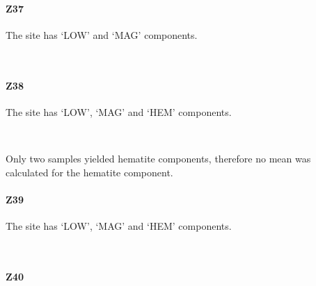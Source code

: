 \documentclass[11pt]{article}
\begin{document}
    \paragraph{Z37}\label{z37}

The site has `LOW' and `MAG' components.



    \begin{center}
    \end{center}
    { \hspace*{\fill} \\}
    
    \newpage
    
    \paragraph{Z38}\label{z38}

    The site has `LOW', `MAG' and `HEM' components.



    \begin{center}
    \end{center}
    { \hspace*{\fill} \\}
    
    Only two samples yielded hematite components, therefore no mean was
calculated for the hematite component.

\newpage

    \paragraph{Z39}\label{z39}

    The site has `LOW', `MAG' and `HEM' components.



    \begin{center}
    \end{center}
    { \hspace*{\fill} \\}
    
    \newpage
    
    \paragraph{Z40}\label{z40}
\end{document}
